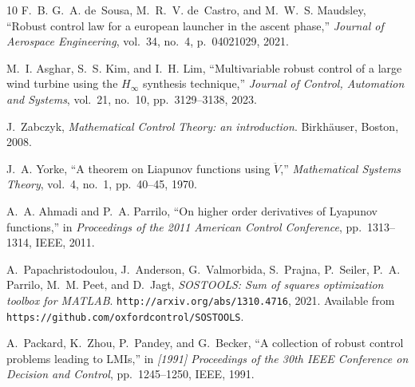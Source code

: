 \documentclass[12pt, a4paper,reqno]{amsart}
\theoremstyle{definition}
\begin{document}
\begin{thebibliography}{10}
F.~B. G.~A. de~Sousa, M.~R.~V. de~Castro, and M.~W.~S. Maudsley, ``Robust
  control law for a european launcher in the ascent phase,'' {\em Journal of
  Aerospace Engineering}, vol.~34, no.~4, p.~04021029, 2021.

M.~I. Asghar, S.~S. Kim, and I.~H. Lim, ``Multivariable robust control of a
  large wind turbine using the {$H_\infty$} synthesis technique,'' {\em Journal
  of Control, Automation and Systems}, vol.~21, no.~10, pp.~3129--3138, 2023.

J.~Zabczyk, {\em Mathematical {C}ontrol {T}heory: an introduction}.
\newblock Birkh\"auser, Boston, 2008.

J.~A. Yorke, ``A theorem on {L}iapunov functions using {$\ddot V$},'' {\em
  Mathematical Systems Theory}, vol.~4, no.~1, pp.~40--45, 1970.

A.~A. Ahmadi and P.~A. Parrilo, ``On higher order derivatives of {L}yapunov
  functions,'' in {\em Proceedings of the 2011 American Control Conference},
  pp.~1313--1314, IEEE, 2011.

A.~Papachristodoulou, J.~Anderson, G.~Valmorbida, S.~Prajna, P.~Seiler, P.~A.
  Parrilo, M.~M. Peet, and D.~Jagt, {\em {SOSTOOLS}: Sum of squares
  optimization toolbox for {MATLAB}}.
\newblock \texttt{http://arxiv.org/abs/1310.4716}, 2021.
\newblock Available from \texttt{https://github.com/oxfordcontrol/SOSTOOLS}.

A.~Packard, K.~Zhou, P.~Pandey, and G.~Becker, ``A collection of robust control
  problems leading to {LMIs},'' in {\em [1991] Proceedings of the 30th IEEE
  Conference on Decision and Control}, pp.~1245--1250, IEEE, 1991.

\end{thebibliography}
\end{document}
